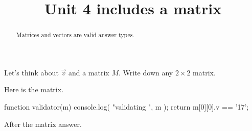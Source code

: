\documentclass{ximera}
\title{Unit 4 includes a matrix}
\begin{document}
\begin{abstract}
  Matrices and vectors are valid answer types.
\end{abstract}

\begin{exercise}
  Let's think about $\vec{v}$ and a matrix $M$.  Write down any $2
  \times 2$ matrix.

\begin{solution}
  Here is the matrix.

\begin{matrixanswer}[name=M]
  function validator(m) {
    console.log( "validating ", m );
    return m[0][0].v == '17';
  }
\end{matrixanswer}

After the matrix answer.

\end{solution}

\end{exercise}
\end{document}
